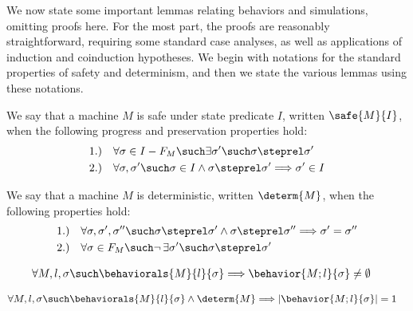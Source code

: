 We now state some important lemmas relating behaviors and simulations,
omitting proofs here. For the most part, the proofs are reasonably 
straightforward, requiring some standard case analyses, as well as 
applications of induction and coinduction hypotheses. We begin with
notations for the standard properties of safety and determinism, and
then we state the various lemmas using these notations.

\begin{definition}[Safety]
We say that a machine $M$ is safe under state predicate $I$, 
written $\safe{M}{I}$, when the following progress and
preservation properties hold:
{\small
\begin{align*}
& 1.) \quad \forall \sigma \in I - F_M \such
\exists \sigma' \such \sigma \steprel \sigma' \\
& 2.) \quad \forall \sigma, \sigma' \such
\sigma \in I \land
\sigma \steprel \sigma' \Longrightarrow \sigma' \in I
\end{align*}}
\end{definition}

\begin{definition}[Determinism]
We say that a machine $M$ is deterministic, written $\determ{M}$,
when the following properties hold:
{\small
\begin{align*}
& 1.) \quad \forall \sigma, \sigma', \sigma'' \such
\sigma \steprel \sigma' \land \sigma \steprel \sigma''
\Longrightarrow \sigma' = \sigma'' \\
& 2.) \quad \forall \sigma \in F_M \such
\lnot \, \exists \sigma' \such \sigma \steprel \sigma'
\end{align*}}
\end{definition}

\begin{lem}
\label{beh-exists}
{\small
\begin{align*}
& \forall M, l, \sigma \such \behaviorals{M}{l}{\sigma}
\Longrightarrow
\behavior{M;l}{\sigma} \neq \emptyset
\end{align*}}
\end{lem}

\begin{lem}
\label{beh-det}
{\small
\begin{align*}
& \forall M, l, \sigma \such 
\behaviorals{M}{l}{\sigma} \land \determ{M} \Longrightarrow
| \behavior{M;l}{\sigma} | = 1
\end{align*}}
\end{lem}

